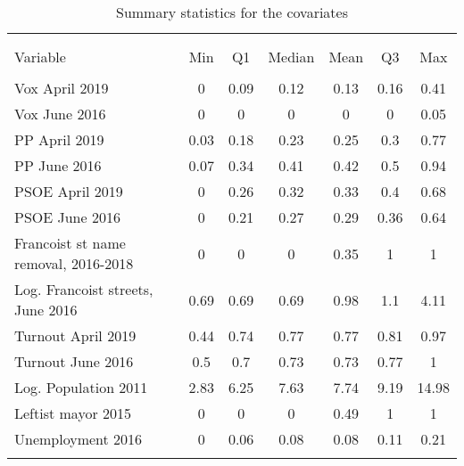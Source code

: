 \begin{table}[!htbp] \centering
\caption{Summary statistics for the covariates}
\label{tab:descriptives}
\small
\begin{tabular}{lcccccc}
\\[-1.8ex]\hline
\hline \\[-1.8ex]
\\[-1.8ex]
Variable & Min & Q1 & Median & Mean & Q3 & Max \\
\hline \\[-1.8ex]
Vox April 2019 & 0 & 0.09 & 0.12 & 0.13 & 0.16 & 0.41 \\
Vox June 2016 & 0 & 0 & 0 & 0 & 0 & 0.05 \\
PP April 2019 & 0.03 & 0.18 & 0.23 & 0.25 & 0.3 & 0.77 \\
PP June 2016 & 0.07 & 0.34 & 0.41 & 0.42 & 0.5 & 0.94 \\
PSOE April 2019 & 0 & 0.26 & 0.32 & 0.33 & 0.4 & 0.68 \\
PSOE June 2016 & 0 & 0.21 & 0.27 & 0.29 & 0.36 & 0.64 \\
Francoist st name removal, 2016-2018 & 0 & 0 & 0 & 0.35 & 1 & 1 \\
Log. Francoist streets, June 2016 & 0.69 & 0.69 & 0.69 & 0.98 & 1.1 & 4.11 \\
Turnout April 2019 & 0.44 & 0.74 & 0.77 & 0.77 & 0.81 & 0.97 \\
Turnout June 2016 & 0.5 & 0.7 & 0.73 & 0.73 & 0.77 & 1 \\
Log. Population 2011 & 2.83 & 6.25 & 7.63 & 7.74 & 9.19 & 14.98 \\
Leftist mayor 2015 & 0 & 0 & 0 & 0.49 & 1 & 1 \\
Unemployment 2016 & 0 & 0.06 & 0.08 & 0.08 & 0.11 & 0.21 \\
\hline
\hline \\[-1.8ex]
\end{tabular}
\end{table}

